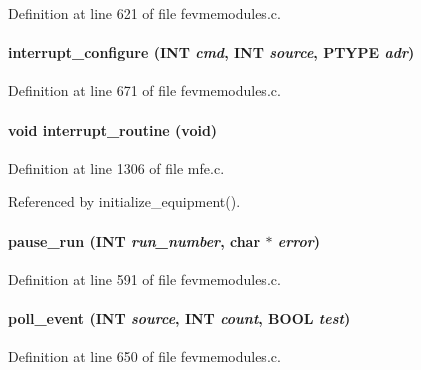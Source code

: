 Definition at line 621 of file fevmemodules.c.
\paragraph[{interrupt\_\-configure}]{ interrupt\_\-configure ({\bf INT} {\em cmd}, \/  {\bf INT} {\em source}, \/  PTYPE {\em adr})}\hfill\label{fevmemodules_8c_a55dc1ffa15566edfd2ad2249aae97c77}


Definition at line 671 of file fevmemodules.c.
\paragraph[{interrupt\_\-routine}]{\setlength{\rightskip}{0pt plus 5cm}void interrupt\_\-routine (void)}\hfill\label{fevmemodules_8c_a8b84b3b4051dae0ba00258a3c885c0c7}


Definition at line 1306 of file mfe.c.

Referenced by initialize\_\-equipment().
\paragraph[{pause\_\-run}]{ pause\_\-run ({\bf INT} {\em run\_\-number}, \/  char $\ast$ {\em error})}\hfill\label{fevmemodules_8c_a164db20cf6c8c81e8c8ca50a590de436}


Definition at line 591 of file fevmemodules.c.
\paragraph[{poll\_\-event}]{ poll\_\-event ({\bf INT} {\em source}, \/  {\bf INT} {\em count}, \/  {\bf BOOL} {\em test})}\hfill\label{fevmemodules_8c_a98cc3257284af91fa0e8da10ddf227c8}


Definition at line 650 of file fevmemodules.c.
